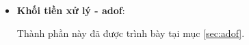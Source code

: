 \begin{itemize}
	
%	
%	
%
%

%

	\item \textbf{Khối tiền xử lý - \gls{adof}}: 
	
	Thành phần này đã được trình bày tại mục \ref{sec:adof}. 


\end{itemize}
